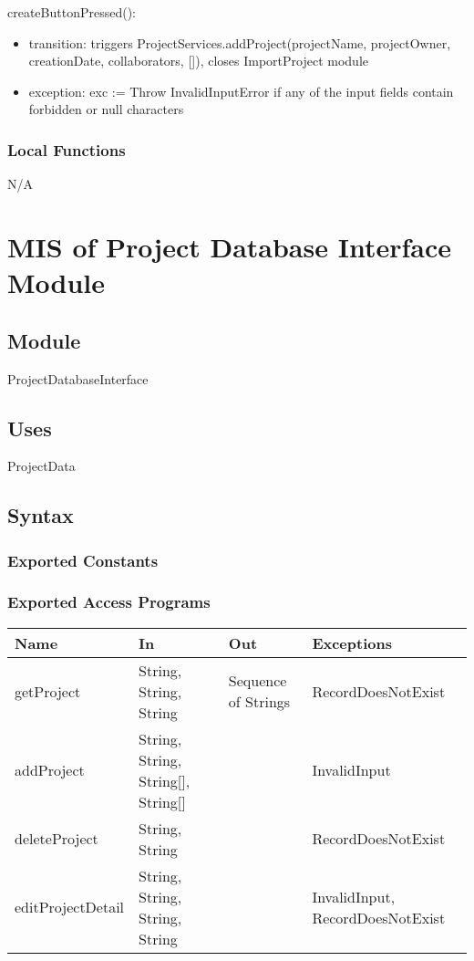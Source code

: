 \documentclass[12pt, titlepage]{article}
\begin{document}
	\noindent createButtonPressed():
	\begin{itemize}
		\item transition: triggers ProjectServices.addProject(projectName, projectOwner, creationDate, collaborators, []), closes ImportProject module
		\item exception: exc := Throw InvalidInputError if any of the input fields contain forbidden or null characters
	\end{itemize}
	
	\subsubsection{Local Functions}
	
	N/A
	
	\newpage
	
	\section{MIS of Project Database Interface Module} \label{Module} 
	
	\subsection{Module}
	
	ProjectDatabaseInterface
	
	\subsection{Uses}
	ProjectData
	
	\subsection{Syntax}
	
	\subsubsection{Exported Constants}
	
	\subsubsection{Exported Access Programs}
	
	\footnotesize\begin{center}
		\begin{tabular}{l l l l}
			\hline
			\textbf{Name} & \textbf{In} & \textbf{Out} & \textbf{Exceptions} \\
			\hline
			getProject & String, String, String & Sequence of Strings & RecordDoesNotExist \\
			\hline
			addProject & String, String, String[], String[] & & InvalidInput \\
			\hline
			deleteProject & String, String & & RecordDoesNotExist \\
			\hline
			editProjectDetail & String, String, String, String & &InvalidInput, RecordDoesNotExist \\
			\hline
		\end{tabular}
	\end{center}
	\normalsize
	
\end{document}
